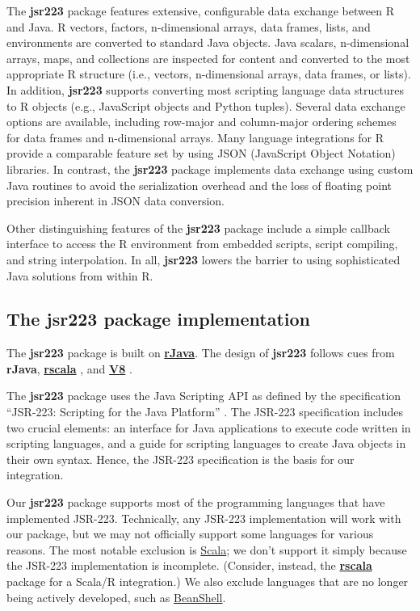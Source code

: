 \documentclass[
article,
11pt, %
a4paper, %
oneside, %
headinclude,footinclude, %
]{scrartcl}
\theoremstyle{definition} %
\theoremstyle{plain} %
\theoremstyle{remark} %
\newcommand{\pkg}[1]{\textbf{#1}}
\newcommand{\CRANpkg}[1]{\href{https://CRAN.R-project.org/package=#1}{\pkg{#1}}}
\begin{document}
The \pkg{jsr223} package features extensive, configurable data exchange between R and Java. R vectors, factors, n-dimensional arrays, data frames, lists, and environments are converted to standard Java objects. Java scalars, n-dimensional arrays, maps, and collections are inspected for content and converted to the most appropriate R structure (i.e., vectors, n-dimensional arrays, data frames, or lists). In addition, \pkg{jsr223} supports converting most scripting language data structures to R objects (e.g., JavaScript objects and Python tuples). Several data exchange options are available, including row-major and column-major ordering schemes for data frames and n-dimensional arrays. Many language integrations for R provide a comparable feature set by using JSON (JavaScript Object Notation) libraries. In contrast, the \pkg{jsr223} package implements data exchange using custom Java routines to avoid the serialization overhead and the loss of floating point precision inherent in JSON data conversion.

Other distinguishing features of the \pkg{jsr223} package include a simple callback interface to access the R environment from embedded scripts, script compiling, and string interpolation. In all, \pkg{jsr223} lowers the barrier to using sophisticated Java solutions from within R.

\subsection{The \pkg{jsr223} package implementation}

The \pkg{jsr223} package is built on \CRANpkg{rJava}. The design of \pkg{jsr223} follows cues from \pkg{rJava}, \CRANpkg{rscala} \citep{rscala}, and \CRANpkg{V8} \citep{v8pkg}.

The \pkg{jsr223} package uses the Java Scripting API \citep{jsa} as defined by the specification “JSR-223: Scripting for the Java Platform” \citep{jsr223spec}. The JSR-223 specification includes two crucial elements: an interface for Java applications to execute code written in scripting languages, and a guide for scripting languages to create Java objects in their own syntax. Hence, the JSR-223 specification is the basis for our integration.

Our \pkg{jsr223} package supports most of the programming languages that have implemented JSR-223. Technically, any JSR-223 implementation will work with our package, but we may not officially support some languages for various reasons. The most notable exclusion is \href{https://www.scala-lang.org/}{Scala}; we don't support it simply because the JSR-223 implementation is incomplete. (Consider, instead, the \CRANpkg{rscala} package for a Scala/R integration.) We also exclude languages that are no longer being actively developed, such as \href{http://www.beanshell.org/}{BeanShell}.
\end{document}
